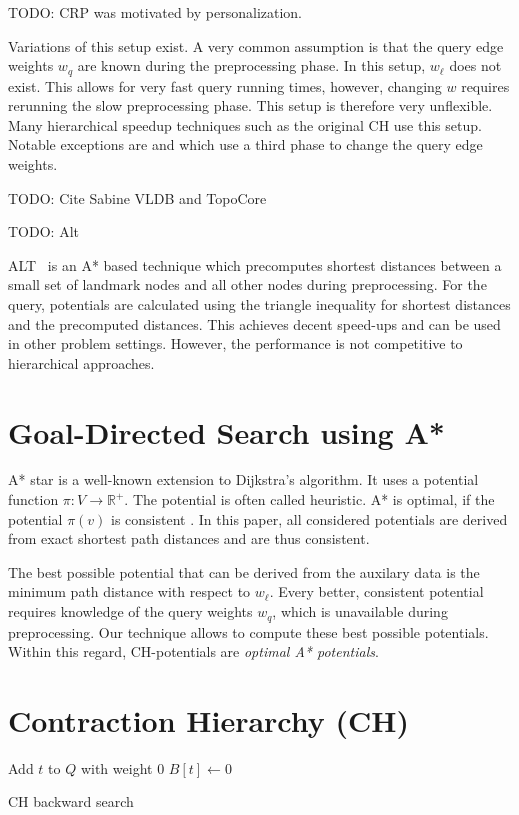 \documentclass[a4paper,UKenglish,cleveref, autoref]{lipics-v2019}
\begin{document}
TODO: CRP was motivated by personalization.

Variations of this setup exist.
A very common assumption is that the query edge weights $w_q$ are known during the preprocessing phase.
In this setup, $w_\ell$ does not exist.
This allows for very fast query running times, however, changing $w$ requires rerunning the slow preprocessing phase.
This setup is therefore very unflexible.
Many hierarchical speedup techniques such as the original CH \cite{gssv-erlrn-12} use this setup.
Notable exceptions are \cite{dgpw-crprn-13} and \cite{dsw-cch-15} which use a third phase to change the query edge weights.


TODO: Cite Sabine VLDB and TopoCore

TODO: Alt

ALT~\cite{gh-cspas-05} is an A* based technique which precomputes shortest distances between a small set of landmark nodes and all other nodes during preprocessing.
For the query, potentials are calculated using the triangle inequality for shortest distances and the precomputed distances.
This achieves decent speed-ups and can be used in other problem settings.
However, the performance is not competitive to hierarchical approaches.

\section{Goal-Directed Search using A*}

A* star is a well-known extension to Dijkstra's algorithm.
It uses a potential function $\pi:V\rightarrow \mathbb{R}^+$.
The potential is often called heuristic.
A* is optimal, if the potential $\pi(v)$ is consistent \cite{p-hissc-84}.
In this paper, all considered potentials are derived from exact shortest path distances and are thus consistent.

The best possible potential that can be derived from the auxilary data is the minimum path distance with respect to $w_\ell$.
Every better, consistent potential requires knowledge of the query weights $w_q$, which is unavailable during preprocessing.
Our technique allows to compute these best possible potentials.
Within this regard, CH-potentials are \emph{optimal A* potentials}.

\section{Contraction Hierarchy (CH)}

\begin{algorithm2e}
Add $t$ to $Q$ with weight 0\;
$B[t] \leftarrow 0$\;
\caption{CH backward search}
\label{algo:ch-backward}
\end{algorithm2e}
\end{document}

